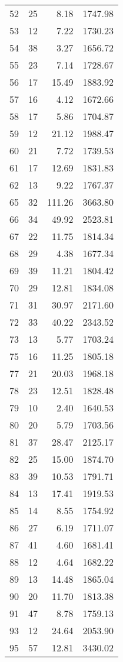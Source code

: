 \begin{appendix}
\begin{compacttable}
\begin{longtable}{@{}rrrr@{}}
52 & 25 & 8.18 & 1747.98 \\
53 & 12 & 7.22 & 1730.23 \\
54 & 38 & 3.27 & 1656.72 \\
55 & 23 & 7.14 & 1728.67 \\
56 & 17 & 15.49 & 1883.92 \\
57 & 16 & 4.12 & 1672.66 \\
58 & 17 & 5.86 & 1704.87 \\
59 & 12 & 21.12 & 1988.47 \\
60 & 21 & 7.72 & 1739.53 \\
61 & 17 & 12.69 & 1831.83 \\
62 & 13 & 9.22 & 1767.37 \\
65 & 32 & 111.26 & 3663.80 \\
66 & 34 & 49.92 & 2523.81 \\
67 & 22 & 11.75 & 1814.34 \\
68 & 29 & 4.38 & 1677.34 \\
69 & 39 & 11.21 & 1804.42 \\
70 & 29 & 12.81 & 1834.08 \\
71 & 31 & 30.97 & 2171.60 \\
72 & 33 & 40.22 & 2343.52 \\
73 & 13 & 5.77 & 1703.24 \\
75 & 16 & 11.25 & 1805.18 \\
77 & 21 & 20.03 & 1968.18 \\
78 & 23 & 12.51 & 1828.48 \\
79 & 10 & 2.40 & 1640.53 \\
80 & 20 & 5.79 & 1703.56 \\
81 & 37 & 28.47 & 2125.17 \\
82 & 25 & 15.00 & 1874.70 \\
83 & 39 & 10.53 & 1791.71 \\
84 & 13 & 17.41 & 1919.53 \\
85 & 14 & 8.55 & 1754.92 \\
86 & 27 & 6.19 & 1711.07 \\
87 & 41 & 4.60 & 1681.41 \\
88 & 12 & 4.64 & 1682.22 \\
89 & 13 & 14.48 & 1865.04 \\
90 & 20 & 11.70 & 1813.38 \\
91 & 47 & 8.78 & 1759.13 \\
93 & 12 & 24.64 & 2053.90 \\
95 & 57 & 12.81 & 3430.02 \\

\end{longtable}
\end{compacttable}
\end{appendix}
